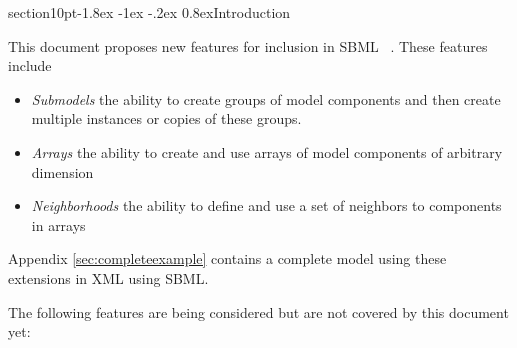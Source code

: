 \documentclass[10pt]{article}
\makeatletter
\renewcommand{\section}{\@startsection%
  {section}{1}{0pt}{-1.8ex \@plus -1ex \@minus -.2ex}%
  {0.8ex}{\normalfont\Large\bfseries\sffamily}}
\makeatother
\begin{document}

\section{Introduction}

\label{sec:introduction}


This document proposes new features for inclusion in SBML ~\cite{Finney:SBMLv1}.  These
features include

\begin{itemize}
\item \emph{Submodels} the ability to create groups of model components and then
create multiple instances or copies of these groups.

\item \emph{Arrays} the ability to create and use arrays of model components of arbitrary dimension

\item \emph{Neighborhoods} the ability to define and use a set of neighbors to components in arrays

\end{itemize}
Appendix \ref{sec:completeexample} contains a complete model
using these extensions in XML using SBML.

The following features are being considered but are not covered by this document yet:
\end{document}
